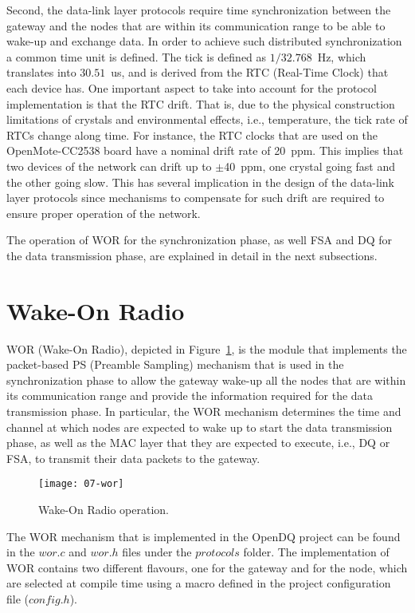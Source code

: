 Second, the data-link layer protocols require time synchronization between the gateway and the nodes that are within its communication range to be able to wake-up and exchange data. In order to achieve such distributed synchronization a common time unit is defined. The tick is defined as $1/32.768$~Hz, which translates into $30.51$~us, and is derived from the RTC (Real-Time Clock) that each device has. One important aspect to take into account for the protocol implementation is that the RTC drift. That is, due to the physical construction limitations of crystals and environmental effects, i.e., temperature, the tick rate of RTCs change along time. For instance, the RTC clocks that are used on the OpenMote-CC2538 board have a nominal drift rate of 20~ppm. This implies that two devices of the network can drift up to $\pm$40~ppm, one crystal going fast and the other going slow. This has several implication in the design of the data-link layer protocols since mechanisms to compensate for such drift are required to ensure proper operation of the network.

The operation of WOR for the synchronization phase, as well FSA and DQ for the data transmission phase, are explained in detail in the next subsections.

\section{Wake-On Radio}
\label{sec:06-wor}
WOR (Wake-On Radio), depicted in Figure~\ref{fig:07-wor}, is the module that implements the packet-based PS (Preamble Sampling) mechanism that is used in the synchronization phase to allow the gateway wake-up all the nodes that are within its communication range and provide the information required for the data transmission phase. In particular, the WOR mechanism determines the time and channel at which nodes are expected to wake up to start the data transmission phase, as well as the MAC layer that they are expected to execute, i.e., DQ or FSA, to transmit their data packets to the gateway.

\begin{figure}[!ht]
    \centering
	\texttt{[image: 07-wor]}
    \caption{Wake-On Radio operation.}
    \label{fig:07-wor}
\end{figure}

The WOR mechanism that is implemented in the OpenDQ project can be found in the $wor.c$ and $wor.h$ files under the $protocols$ folder. The implementation of WOR contains two different flavours, one for the gateway and for the node, which are selected at compile time using a macro defined in the project configuration file ($config.h$).

